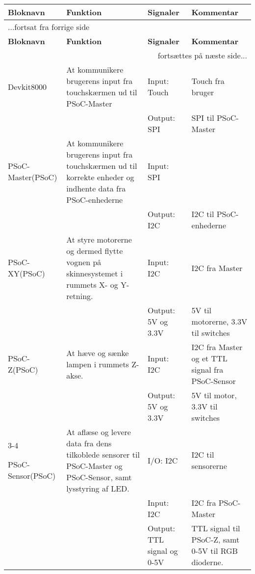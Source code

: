 \begin{center} \centering
    \begin{longtable}{|p{}|p{}|p{}|p{}|} \hline
	\textbf{Bloknavn} & \textbf{Funktion} & \textbf{Signaler} & \textbf{Kommentar} \\ \hline
	\endfirsthead
		
	\multicolumn{4}{l}{...fortsat fra forrige side} \\ \hline 
	\textbf{Bloknavn} & \textbf{Funktion} & \textbf{Signaler} & \textbf{Kommentar} \\ \hline
	\endhead

	\multicolumn{4}{r}{fortsættes på næste side...} \\
    \endfoot
    \endlastfoot
        
        Devkit8000
        & At kommunikere brugerens input fra touchskærmen ud til PSoC-Master
        & Input: Touch
        & Touch fra bruger
        \\ \cline{3-4}
        &
        & Output: SPI
        & SPI til PSoC-Master
        \\ \hline
        
        PSoC-Master(PSoC)
        & At kommunikere brugerens input fra touchskærmen ud til korrekte enheder og indhente data fra PSoC-enhederne
        & Input: SPI
        & 
        \\ \cline{3-4}
        &
        & Output: I2C
        & I2C til PSoC-enhederne
        \\ \hline
        
        PSoC-XY(PSoC)
        & At styre motorerne og dermed flytte vognen på skinnesystemet i rummets X- og Y-retning.
        & Input: I2C
        & I2C fra Master
        \\ \cline{3-4}
        &
        & Output: 5V og 3.3V
        & 5V til motorerne, 3.3V til switches
        \\ \hline
        
        PSoC-Z(PSoC)
        & At hæve og sænke lampen i rummets Z-akse. 
        & Input: I2C
        & I2C fra Master og et TTL signal fra PSoC-Sensor
        \\ \cline{3-4}
        &
        & Output: 5V og 3.3V
        & 5V til motor, 3.3V til switches
        \\ \hline{3-4}
        
        PSoC-Sensor(PSoC)
        & At aflæse og levere data fra dens tilkoblede sensorer til PSoC-Master og PSoC-Sensor, samt lysstyring af LED.
        & I/O: I2C 
        & I2C til sensorerne
        \\ \cline{3-4}
        &
        & Input: I2C
        & I2C fra PSoC-Master
        \\ \cline{3-4}
        &
        & Output: TTL signal og 0-5V  
        & TTL signal til PSoC-Z, samt 0-5V til RGB dioderne.
        \\ \hline
        

\end{longtable}
\end{center}
